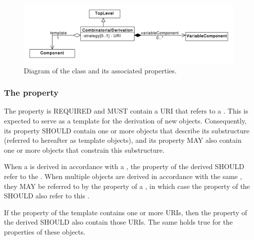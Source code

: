 \begin{figure}[ht]
\begin{center}
\includegraphics[scale=0.6]{uml/combinatorial_derivation}
\caption[]{Diagram of the  class and its associated properties.}
\label{uml:combinatorial_derivation}
\end{center}
\end{figure}

\subsubsection*{ The  property}\label{sec:template}

The  property is REQUIRED and MUST contain a URI that refers to a . 
This  is expected to serve as a template for the derivation of new  objects. 
Consequently, its  property SHOULD contain one or more  objects that describe its substructure (referred to hereafter as template  objects), and its  property MAY also contain one or more  objects that constrain this substructure.

When a  is derived in accordance with a , the  property of the derived  SHOULD refer to the . When multiple  objects are derived in accordance with the same , they MAY be referred to by the  property of a , in which case the  property of the  SHOULD also refer to this .

If the  property of the template  contains one or more URIs, then the  property of the derived  SHOULD also contain those URIs. The same holds true for the  properties of these  objects.

